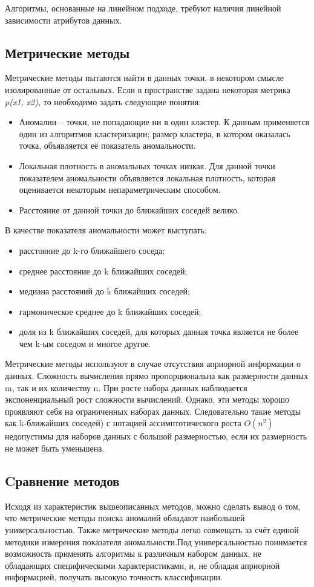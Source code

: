 Алгоритмы, основанные на линейном подходе, требуют  наличия линейной зависимости атрибутов данных. 
\subsection{Метрические методы}
Метрические методы пытаются найти в данных точки, в некотором смысле
изолированные от остальных\cite{Book01}. Если в пространстве задана некоторая метрика \textit{p(x1, x2)}, то необходимо задать следующие понятия:
\begin{itemize}
	\item  Аномалии – точки, не попадающие ни в один кластер. К данным применяется один из алгоритмов кластеризации; размер кластера, в котором оказалась точка, объявляется её показатель аномальности.
	\item Локальная плотность в аномальных точках низкая. Для данной точки показателем аномальности объявляется локальная плотность, которая оценивается некоторым непараметрическим способом.
	\item Расстояние от данной точки до ближайших соседей велико.
\end{itemize}
В качестве показателя аномальности может выступать:
\begin{itemize}
	\item расстояние до k-го ближайшего соседа;
	\item среднее расстояние до k ближайших соседей;
	\item медиана расстояний до k ближайших соседей;
	\item гармоническое среднее до k ближайших соседей;
	\item доля из k ближайших соседей, для которых данная точка является не
	более чем k-ым соседом и многое другое.
\end{itemize}

Метрические методы используют в случае отсутствия априорной информации о данных. Сложность вычисления прямо пропорциональна как размерности данных m, так и их количеству n. При росте набора данных наблюдается экспоненциальный рост сложности вычислений. Однако, эти методы хорошо проявляют себя на ограниченных наборах данных\cite{Book07}. Следовательно такие методы как k-ближайших соседей) с нотацией ассимптотического роста $O(n^2)$ недопустимы для наборов данных с большой размерностью, если их размерность не может быть уменьшена.
\subsection{Cравнение методов}
Исходя из характеристик вышеописанных методов, можно сделать вывод о том, что
метрические методы поиска аномалий обладают наибольшей универсальностью. Также
метрические методы легко совмещать за счёт единой методики измерения показателя
аномальности.Под универсальностью понимается возможность применять алгоритмы к различным набором данных, не обладающих специфическими характеристиками, и, не обладая априорной информацией, получать высокую точность классификации.

